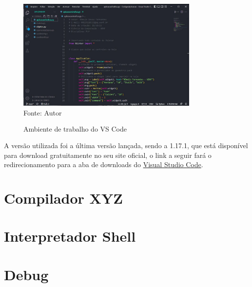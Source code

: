     \begin{figure}[H]
    	\begin{center}
    		\caption{Ambiente de trabalho do VS Code} \label{ling1}
    		\includegraphics[width=9cm]{vscode.JPG} \\
    		{\tiny \sf Fonte:{ Autor}}
    	\end{center}
    \end{figure}
    
    A versão utilizada foi a última versão lançada, sendo a 1.17.1, que está disponível para download gratuitamente no seu site oficial, o link a seguir fará o redirecionamento para a aba de downloads do \href{https://code.visualstudio.com}{Visual Studio Code}.
    
    \section{Compilador XYZ}


    \section{Interpretador Shell}

   
    \section{Debug}
     